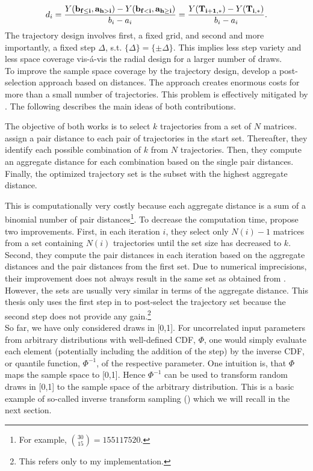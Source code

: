 \begin{align} \label{eq:traj}
d_i =  \frac{Y(\bold{b_{f \leq i}}, \bold{a_{h>i}}) - Y(\bold{b_{f<i}}, \bold{a_{h \geq i}})}{b_i - a_i} = \frac{Y(\bold{T_{i+1,*})} -  Y(\bold{T_{i,*}})}{b_i - a_i}.
\end{align}
The trajectory design involves first, a fixed grid, and second and more importantly, a fixed step $\Delta$, s.t. $\{\Delta\} = \{\pm \Delta\}$. This implies less step variety and less space coverage vis-á-vis the radial design for a larger number of draws.\\

\noindent
To improve the sample space coverage by the trajectory design, \cite{campolongo2007effective} develop a post-selection approach based on distances. The approach creates enormous costs for more than a small number of trajectories. This problem is effectively mitigated by \cite{ge2014efficient}. The following describes the main ideas of both contributions.

The objective of both works is to select $k$ trajectories from a set of $N$ matrices. \cite{campolongo2007effective} assign a pair distance to each pair of trajectories in the start set. Thereafter, they identify each possible combination of $k$ from $N$ trajectories. Then, they compute an aggregate distance for each combination based on the single pair distances. Finally, the optimized trajectory set is the subset with the highest aggregate distance.

This is computationally very costly because each aggregate distance is a sum of a binomial number of pair distances\footnote{For example, $\binom{30}{15} = 155117520$.}. To decrease the computation time, \cite{ge2014efficient} propose two improvements. First, in each iteration $i$, they select only $N(i)-1$ matrices from a set containing $N(i)$ trajectories until the set size has decreased to $k$. Second, they compute the pair distances in each iteration based on the aggregate distances and the pair distances from the first set. Due to numerical imprecisions, their improvement does not always result in the same set as obtained from \cite{campolongo2007effective}. However, the sets are usually very similar in terms of the aggregate distance. This thesis only uses the first step in \cite{ge2014efficient} to post-select the trajectory set because the second step does not provide any gain.\footnote{This refers only to my implementation.}\\


\noindent
So far, we have only considered draws in [0,1]. For uncorrelated input parameters from arbitrary distributions with well-defined CDF, $\Phi$, one would simply evaluate each element (potentially including the addition of the step) by the inverse CDF, or quantile function, $\Phi^{-1}$, of the respective parameter. One intuition is, that $\Phi$ maps the sample space to [0,1]. Hence $\Phi^{-1}$ can be used to transform random draws in [0,1] to the sample space of the arbitrary distribution. This is a basic example of so-called inverse transform sampling (\cite{devroye1986sample}) which we will recall in the next section.



